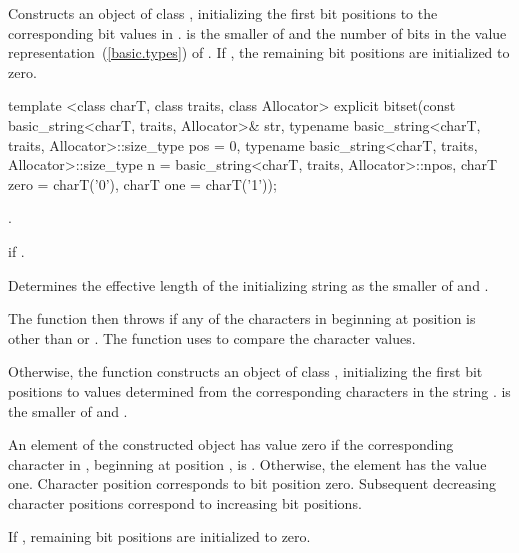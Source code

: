 \begin{itemdescr}
\pnum
\effects
Constructs an object of class
,
initializing the first  bit positions to the corresponding bit
values in .
 is the smaller of  and the number of bits in the value
representation~(\ref{basic.types}) of .
If , the remaining bit positions are initialized to zero.
\end{itemdescr}

\begin{itemdecl}
template <class charT, class traits, class Allocator>
explicit
bitset(const basic_string<charT, traits, Allocator>& str,
       typename basic_string<charT, traits, Allocator>::size_type pos = 0,
       typename basic_string<charT, traits, Allocator>::size_type n =
         basic_string<charT, traits, Allocator>::npos,
         charT zero = charT('0'), charT one = charT('1'));
\end{itemdecl}

\begin{itemdescr}
\pnum
\requires
{}.

\pnum
\throws
{}
if
.%

\pnum
\effects
Determines the effective length
 of the initializing string as the smaller of
 and
.

The function then throws%
if any of the 
characters in  beginning at position  is
other than  or . The function uses 
to compare the character values.

Otherwise, the function constructs an object of class
,
initializing the first  bit
positions to values determined from the corresponding characters in the string
.
 is the smaller of  and .

\pnum
An element of the constructed object has value zero if the
corresponding character in , beginning at position
, is
.
Otherwise, the element has the value one.
Character position  corresponds to bit position zero.
Subsequent decreasing character positions correspond to increasing bit positions.

\pnum
If , remaining bit positions are initialized to zero.
\end{itemdescr}

